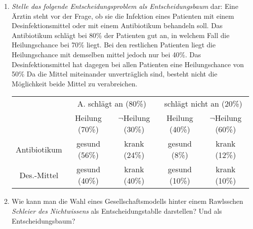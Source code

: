 \begin{enumerate}
 \item {\em Stelle das folgende Entscheidungsproblem als Entscheidungsbaum} dar:
  Eine Ärztin steht vor der Frage, ob sie die Infektion eines Patienten mit einem
Desinfektionsmittel oder mit einem Antibiotikum behandeln soll. Das Antibiotikum
schlägt bei 80\% der Patienten gut an, in welchem Fall die Heilungschance bei
70\% liegt. Bei den restlichen Patienten liegt die Heilungschance mit demselben
mittel jedoch nur bei 40\%. Das Desinfektionsmittel hat dagegen bei allen
Patienten eine Heilungschance von 50\% Da die Mittel miteinander unverträglich
sind, besteht nicht die Möglichkeit beide Mittel zu verabreichen.

\begin{center}
\begin{scriptsize}
\begin{tabular}{c|c|c|c|c|}
\multicolumn{1}{c}{} & \multicolumn{2}{c}{A. schlägt an (80\%)} 
                     & \multicolumn{2}{c}{schlägt nicht an (20\%)} \\
\multicolumn{1}{c}{} & \multicolumn{1}{c}{Heilung (70\%)}
                     & \multicolumn{1}{c}{$\neg$Heilung (30\%)}
                     & \multicolumn{1}{c}{Heilung (40\%)}
                     & \multicolumn{1}{c}{$\neg$Heilung (60\%)}
                     \\ \cline{2-5}                       
Antibiotikum  & gesund (56\%) & krank (24\%) & gesund (8\%) & krank (12\%) 
\\ \cline{2-5} 
Des.-Mittel   & gesund (40\%) & krank (40\%) & gesund (10\%) & krank (10\%) 
\\ \cline{2-5}
\end{tabular}
\end{scriptsize}
\end{center}
  
\item Wie kann man die Wahl eines Gesellschaftsmodells hinter einem Rawlsschen
{\em Schleier des Nichtwissens} als Entscheidungstablle darstellen? Und als
Entscheidungsbaum?  

\end{enumerate}


